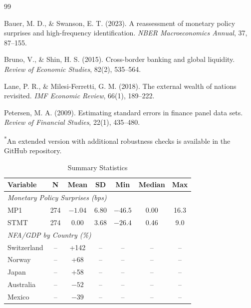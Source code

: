 \documentclass[12pt]{article}
\begin{document}

\begin{thebibliography}{99}

Bauer, M. D., \& Swanson, E. T. (2023).
A reassessment of monetary policy surprises and high-frequency identification.
\textit{NBER Macroeconomics Annual}, 37, 87--155.

Bruno, V., \& Shin, H. S. (2015).
Cross-border banking and global liquidity.
\textit{Review of Economic Studies}, 82(2), 535--564.

Lane, P. R., \& Milesi-Ferretti, G. M. (2018).
The external wealth of nations revisited.
\textit{IMF Economic Review}, 66(1), 189--222.

Petersen, M. A. (2009).
Estimating standard errors in finance panel data sets.
\textit{Review of Financial Studies}, 22(1), 435--480.

\end{thebibliography}

\vspace{1em}
\noindent\footnotesize\textsuperscript{*}An extended version with additional robustness checks is available in the GitHub repository.


\begin{table}
\centering
\caption{Summary Statistics}
\label{tab:summary}
\begin{tabular}{lcccccc}
\toprule
Variable & N & Mean & SD & Min & Median & Max \\
\midrule
\multicolumn{7}{l}{\textit{Monetary Policy Surprises (bps)}} \\
MP1 & 274 & $-1.04$ & 6.80 & $-46.5$ & 0.00 & 16.3 \\
STMT & 274 & 0.00 & 3.68 & $-26.4$ & 0.46 & 9.0 \\
\midrule
\multicolumn{7}{l}{\textit{NFA/GDP by Country (\%)}} \\
Switzerland & -- & +142 & -- & -- & -- & -- \\
Norway & -- & +68 & -- & -- & -- & -- \\
Japan & -- & +58 & -- & -- & -- & -- \\
Australia & -- & $-52$ & -- & -- & -- & -- \\
Mexico & -- & $-39$ & -- & -- & -- & -- \\
\bottomrule
\end{tabular}
\end{table}
\end{document}
